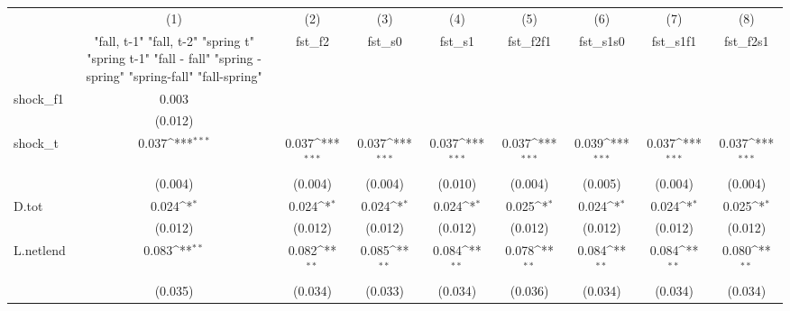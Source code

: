 {
\def\sym#1{\ifmmode^{#1}\else\(^{#1}\)\fi}
\begin{tabular}{l*{8}{c}}
\toprule
            &\multicolumn{1}{c}{(1)}&\multicolumn{1}{c}{(2)}&\multicolumn{1}{c}{(3)}&\multicolumn{1}{c}{(4)}&\multicolumn{1}{c}{(5)}&\multicolumn{1}{c}{(6)}&\multicolumn{1}{c}{(7)}&\multicolumn{1}{c}{(8)}\\
            &\multicolumn{1}{c}{  "fall, t-1" "fall, t-2" "spring t" "spring t-1"  "fall - fall" "spring - spring" "spring-fall" "fall-spring" }&\multicolumn{1}{c}{fst\_f2}&\multicolumn{1}{c}{fst\_s0}&\multicolumn{1}{c}{fst\_s1}&\multicolumn{1}{c}{fst\_f2f1}&\multicolumn{1}{c}{fst\_s1s0}&\multicolumn{1}{c}{fst\_s1f1}&\multicolumn{1}{c}{fst\_f2s1}\\
\midrule
shock\_f1    &       0.003         &                     &                     &                     &                     &                     &                     &                     \\
            &     (0.012)         &                     &                     &                     &                     &                     &                     &                     \\
\addlinespace
shock\_t     &       0.037\sym{***}&       0.037\sym{***}&       0.037\sym{***}&       0.037\sym{***}&       0.037\sym{***}&       0.039\sym{***}&       0.037\sym{***}&       0.037\sym{***}\\
            &     (0.004)         &     (0.004)         &     (0.004)         &     (0.010)         &     (0.004)         &     (0.005)         &     (0.004)         &     (0.004)         \\
\addlinespace
D.tot       &       0.024\sym{*}  &       0.024\sym{*}  &       0.024\sym{*}  &       0.024\sym{*}  &       0.025\sym{*}  &       0.024\sym{*}  &       0.024\sym{*}  &       0.025\sym{*}  \\
            &     (0.012)         &     (0.012)         &     (0.012)         &     (0.012)         &     (0.012)         &     (0.012)         &     (0.012)         &     (0.012)         \\
\addlinespace
L.netlend   &       0.083\sym{**} &       0.082\sym{**} &       0.085\sym{**} &       0.084\sym{**} &       0.078\sym{**} &       0.084\sym{**} &       0.084\sym{**} &       0.080\sym{**} \\
            &     (0.035)         &     (0.034)         &     (0.033)         &     (0.034)         &     (0.036)         &     (0.034)         &     (0.034)         &     (0.034)         \\

\end{tabular}}
